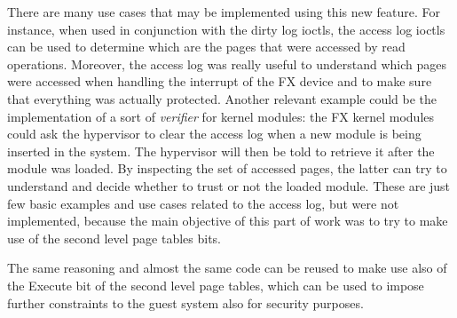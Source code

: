 There are many use cases that may be implemented using this new feature. For instance, when used in conjunction with the dirty log ioctls, the access log ioctls can be used to determine which are the pages that were accessed by read operations. Moreover, the access log was really useful to understand which pages were accessed when handling the interrupt of the FX device and to make sure that everything was actually protected. Another relevant example could be the implementation of a sort of \emph{verifier} for kernel modules: the FX kernel modules could ask the hypervisor to clear the access log when a new module is being inserted in the system. The hypervisor will then be told to retrieve it after the module was loaded. By inspecting the set of accessed pages, the latter can try to understand and decide whether to trust or not the loaded module. These are just few basic examples and use cases related to the access log, but were not implemented, because the main objective of this part of work was to try to make use of the second level page tables bits.
\par 
The same reasoning and almost the same code can be reused to make use also of the Execute bit of the second level page tables, which can be used to impose further constraints to the guest system also for security purposes.

